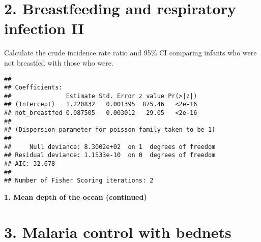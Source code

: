 \documentclass[10pt,handout]{beamer}\usepackage[]{graphicx}\usepackage[]{color}
\makeatletter
\newenvironment{kframe}{%
 \def\at@end@of@kframe{}%
 \ifinner\ifhmode%
  \def\at@end@of@kframe{\end{minipage}}%
  \begin{minipage}{\columnwidth}%
 \fi\fi%
 \def\FrameCommand##1{\hskip\@totalleftmargin \hskip-\fboxsep
 \colorbox{shadecolor}{##1}\hskip-\fboxsep
     \hskip-\linewidth \hskip-\@totalleftmargin \hskip\columnwidth}%
 \MakeFramed {\advance\hsize-\width
   \@totalleftmargin\z@ \linewidth\hsize
   \@setminipage}}%
 {\par\unskip\endMakeFramed%
 \at@end@of@kframe}
\newenvironment{knitrout}{}{} %
\makeatother
\begin{document}
\section{2. Breastfeeding and respiratory infection II}
\begin{frame}
	\vspace*{-1.291in}
	\tiny
Calculate the crude incidence rate ratio and 95\% CI comparing infants who were not breastfed with those who were.
\begin{knitrout}\tiny
{}\color{fgcolor}\begin{kframe}
\begin{verbatim}
## 
## Coefficients:
##               Estimate Std. Error z value Pr(>|z|)
## (Intercept)   1.220832   0.001395  875.46   <2e-16
## not_breastfed 0.087505   0.003012   29.05   <2e-16
## 
## (Dispersion parameter for poisson family taken to be 1)
## 
##     Null deviance: 8.3002e+02  on 1  degrees of freedom
## Residual deviance: 1.1533e-10  on 0  degrees of freedom
## AIC: 32.678
## 
## Number of Fisher Scoring iterations: 2
\end{verbatim}
\end{kframe}
\end{knitrout}
	
\end{frame}

\begin{frame}
	\vspace*{-5.0in}
	\textbf{1. Mean depth of the ocean (continued)}
	
\end{frame}



\section{3. Malaria control with bednets}
\end{document}
